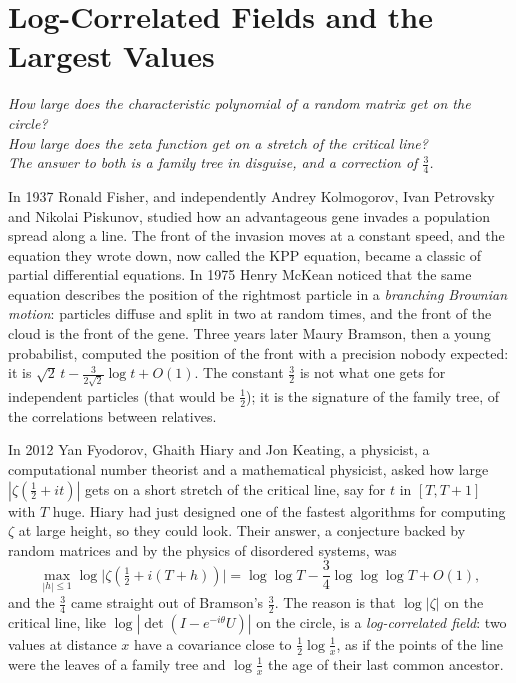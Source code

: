 \chapter{Log-Correlated Fields and the Largest Values}\label{ch:logcorr}

\begin{center}\itshape
How large does the characteristic polynomial of a random matrix get on the circle?\\
How large does the zeta function get on a stretch of the critical line?\\
The answer to both is a family tree in disguise, and a correction of $\frac34$.
\end{center}

In 1937 Ronald Fisher, and independently Andrey Kolmogorov, Ivan Petrovsky and Nikolai Piskunov, studied how an advantageous gene invades a population spread along a line. The front of the invasion moves at a constant speed,
and the equation they wrote down, now called the KPP equation, became a classic of partial differential equations. In 1975 Henry McKean noticed that the same equation describes the position of the rightmost particle in a
\emph{branching Brownian motion}: particles diffuse and split in two at random times, and the front of the cloud is the front of the gene. Three years later Maury Bramson, then a young probabilist, computed the position of
the front with a precision nobody expected: it is $\sqrt2\,t-\frac3{2\sqrt2}\log t+O(1)$. The constant $\frac32$ is not what one gets for independent particles (that would be $\frac12$); it is the signature of the family tree, of the
correlations between relatives.

In 2012 Yan Fyodorov, Ghaith Hiary and Jon Keating, a physicist, a computational number theorist and a mathematical physicist, asked how large $|\zeta(\frac12+it)|$ gets on a short stretch of the critical line, say for $t$ in $[T,T+1]$ with
$T$ huge. Hiary had just designed one of the fastest algorithms for computing $\zeta$ at large height, so they could look. Their answer, a conjecture backed by random matrices and by the physics of disordered systems, was
\[
\max_{|h|\le1}\log\bigl|\zeta(\tfrac12+i(T+h))\bigr|=\log\log T-\frac34\log\log\log T+O(1),
\]
and the $\frac34$ came straight out of Bramson's $\frac32$. The reason is that $\log|\zeta|$ on the critical line, like $\log|\det(I-e^{-i\theta}U)|$ on the circle, is a \emph{log-correlated field}: two values at distance $x$ have a
covariance close to $\frac12\log\frac1x$, as if the points of the line were the leaves of a family tree and $\log\frac1x$ the age of their last common ancestor.

